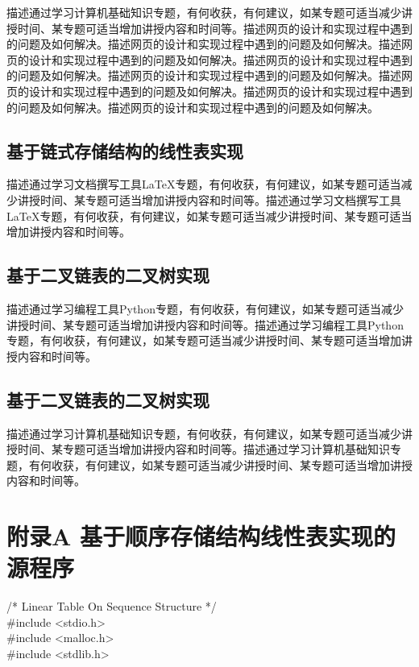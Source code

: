 \documentclass[supercite]{Experimental_Report}
\theoremstyle{definition}
\begin{document}
描述通过学习计算机基础知识专题，有何收获，有何建议，如某专题可适当减少讲授时间、某专题可适当增加讲授内容和时间等。描述网页的设计和实现过程中遇到的问题及如何解决。描述网页的设计和实现过程中遇到的问题及如何解决。描述网页的设计和实现过程中遇到的问题及如何解决。描述网页的设计和实现过程中遇到的问题及如何解决。描述网页的设计和实现过程中遇到的问题及如何解决。描述网页的设计和实现过程中遇到的问题及如何解决。描述网页的设计和实现过程中遇到的问题及如何解决。描述网页的设计和实现过程中遇到的问题及如何解决。

\subsection{基于链式存储结构的线性表实现}

描述通过学习文档撰写工具LaTeX专题，有何收获，有何建议，如某专题可适当减少讲授时间、某专题可适当增加讲授内容和时间等。描述通过学习文档撰写工具LaTeX专题，有何收获，有何建议，如某专题可适当减少讲授时间、某专题可适当增加讲授内容和时间等。

\subsection{基于二叉链表的二叉树实现}

描述通过学习编程工具Python专题，有何收获，有何建议，如某专题可适当减少讲授时间、某专题可适当增加讲授内容和时间等。描述通过学习编程工具Python专题，有何收获，有何建议，如某专题可适当减少讲授时间、某专题可适当增加讲授内容和时间等。

\subsection{基于二叉链表的二叉树实现}

描述通过学习计算机基础知识专题，有何收获，有何建议，如某专题可适当减少讲授时间、某专题可适当增加讲授内容和时间等。描述通过学习计算机基础知识专题，有何收获，有何建议，如某专题可适当减少讲授时间、某专题可适当增加讲授内容和时间等。


\nocite{*} %



\setcounter{secnumdepth}{0}
\appendix

\section{附录A 基于顺序存储结构线性表实现的源程序}

\noindent
/* Linear Table On Sequence Structure */\\
\#include <stdio.h>\\
\#include <malloc.h>\\
\#include <stdlib.h>\\
\end{document}
